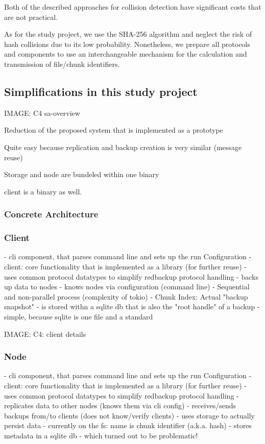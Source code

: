 Both of the described approaches for collision detection have significant costs that are not practical.

As for the study project, we use the SHA-256 algorithm\cite{sha-256} and neglect the risk of hash collisions due to its low probability. Nonetheless, we prepare all protocols and components to use an interchangeable mechanism for the calculation and transmission of file/chunk identifiers.

\subsection{Simplifications in this study project}

IMAGE: C4 sa-overview

Reduction of the proposed system that is implemented as a prototype

Quite easy because replication and backup creation is very similar (message reuse)

Storage and node are bundeled within one binary

client is a binary as well.


\subsubsection{Concrete Architecture}

\subsubsection{Client}

- cli component, that parses command line and sets up the run Configuration
- client: core functionality that is implemented as a library (for further reuse)
- uses common protocol datatypes to simplify redbackup protocol handling
- backs up data to nodes
    - knows nodes via configuration (command line)
- Sequential and non-parallel process (complexity of tokio)
- Chunk Index: Actual "backup snapshot" - is stored withn a sqlite db that is also the "root handle" of a backup
    - simple, because sqlite is one file and a standard

IMAGE: C4: client details

\subsubsection{Node}

- cli component, that parses command line and sets up the run Configuration
- client: core functionality that is implemented as a library (for further reuse)
- uses common protocol datatypes to simplify redbackup protocol handling
- replicates data to other nodes (knows them via cli config)
- receives/sends backups from/to clients (does not know/verify clients)
- uses storage to actually persist data
    - currently on the fs: name is chunk identifier (a.k.a. hash)
- stores metadata in a sqlite db
 - which turned out to be problematic!

